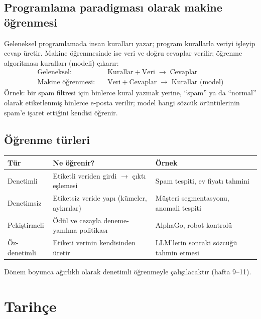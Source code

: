 \documentclass[11pt,a4paper]{article}
\begin{document}
\subsection{Programlama paradigması olarak makine öğrenmesi}
Geleneksel programlamada insan kuralları yazar; program kurallarla veriyi işleyip cevap üretir. Makine öğrenmesinde ise veri ve doğru cevaplar verilir; öğrenme algoritması kuralları (modeli) çıkarır:
\begin{align*}
\text{Geleneksel:}&\quad \text{Kurallar} + \text{Veri} \;\longrightarrow\; \text{Cevaplar}\\
\text{Makine öğrenmesi:}&\quad \text{Veri} + \text{Cevaplar} \;\longrightarrow\; \text{Kurallar (model)}
\end{align*}
Örnek: bir spam filtresi için binlerce kural yazmak yerine, ``spam'' ya da ``normal'' olarak etiketlenmiş binlerce e-posta verilir; model hangi sözcük örüntülerinin spam'e işaret ettiğini kendisi öğrenir.

\subsection{Öğrenme türleri}
\begin{center}
\begin{tabularx}{\textwidth}{@{}l Y Y@{}}
\toprule
\textbf{Tür} & \textbf{Ne öğrenir?} & \textbf{Örnek} \\
\midrule
Denetimli & Etiketli veriden girdi $\to$ çıktı eşlemesi & Spam tespiti, ev fiyatı tahmini \\
Denetimsiz & Etiketsiz veride yapı (kümeler, aykırılar) & Müşteri segmentasyonu, anomali tespiti \\
Pekiştirmeli & Ödül ve cezayla deneme-yanılma politikası & AlphaGo, robot kontrolü \\
Öz-denetimli & Etiketi verinin kendisinden üretir & LLM'lerin sonraki sözcüğü tahmin etmesi \\
\bottomrule
\end{tabularx}
\end{center}
Dönem boyunca ağırlıklı olarak denetimli öğrenmeyle çalışılacaktır (hafta 9–11).

\section{Tarihçe}
\end{document}
